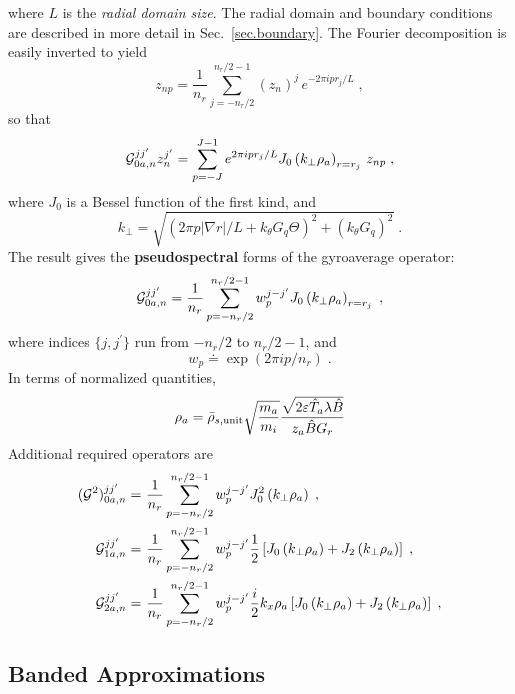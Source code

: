\noindent
where $L$ is the {\it radial domain size}.  The radial domain and 
boundary conditions are described in more detail in Sec.~\ref{sec.boundary}.  The Fourier decomposition is easily 
inverted to yield
%
\begin{equation}
z_{np} = \frac{1}{n_r}\sum_{j=-n_r/2}^{n_r/2-1} (z_n)^j \, 
e^{-2 \pi i p r_j/L} \; ,
\end{equation}
%
so that
%
\begin{equation}
{\cal G}_{0a,n}^{jj^\prime} z_n^{j^\prime} = 
 \sum_{p=-J}^{J-1} e^{2 \pi i p r_j/L}  J_0 
 \left( k_\perp \rho_a \right)_{r=r_j}  \, z_{np} \; , 
\end{equation}
%
where $J_0$ is a Bessel function of the first kind, and
%
\begin{equation}
k_\perp = \sqrt{(2 \pi p |\nabla r| / L + k_\theta G_q \Theta)^2 
+ (k_\theta G_q)^2} \; .
\end{equation}
%
\noindent
The result gives the {\bf pseudospectral} forms of the gyroaverage 
operator:
%
\begin{equation}
{\cal G}_{0a,n}^{jj^\prime} = \frac{1}{n_r} \sum_{p=-n_r/2}^{n_r/2-1}
w_p^{j-j^\prime} J_0 \left( k_\perp \rho_a \right)_{r=r_j} \; , \label{eq.g} 
\end{equation}
%
\noindent
where indices $\{j,j^\prime\}$ run from $-n_r/2$ to $n_r/2-1$, 
and
%
\begin{equation}
w_p \doteq \exp(2 \pi i p/n_r) \; .
\end{equation}
%
In terms of normalized quantities, 
%
\begin{equation}
\rho_a = \bar{\rho}_{s,{\rm unit}} \sqrt{\frac{m_a}{m_i}} 
 \frac{\sqrt{2{\varepsilon}\hat{T}_a\lambda\hat{B}}}{z_a \hat{B} G_r}
\end{equation}
%
Additional required operators are
%
\begin{align}
({\cal G}^2)_{0a,n}^{jj^\prime} = &~\frac{1}{n_r} \sum_{p=-n_r/2}^{n_r/2-1}
w_p^{j-j^\prime} J_0^2 \left( k_\perp \rho_a \right) \; , \\
{\cal G}_{1a,n}^{jj^\prime} = &~\frac{1}{n_r} \sum_{p=-n_r/2}^{n_r/2-1}
w_p^{j-j^\prime} 
\frac{1}{2} \left[ J_0 \left( k_\perp \rho_a \right)
+ J_2 \left( k_\perp \rho_a \right) \right]  \; , \\
{\cal G}_{2a,n}^{jj^\prime} = &~\frac{1}{n_r} \sum_{p=-n_r/2}^{n_r/2-1}
w_p^{j-j^\prime} 
\frac{i}{2} k_x \rho_a \left[ J_0 \left( k_\perp \rho_a \right)
+ J_2 \left( k_\perp \rho_a \right) \right]  \; , 
\end{align}


\subsection{Banded Approximations}

